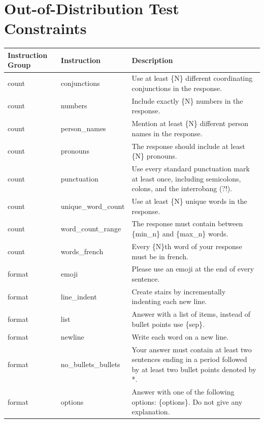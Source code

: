 \documentclass{article}
\begin{document}
\section{Out-of-Distribution Test Constraints}
\label{app:test_const}
\begin{longtable}{@{}p{} p{} p{}@{}}
\toprule
\textbf{Instruction Group} & \textbf{Instruction}     & \textbf{Description}  \\ 
\midrule 
\endhead 
count    & conjunctions             & Use at least \{N\} different coordinating conjunctions in the response.
\\ \midrule
count    & numbers                  & Include exactly \{N\} numbers in the response.
\\ \midrule
count    & person\_names            & Mention at least \{N\} different person names in the response.
\\ \midrule
count    & pronouns                 & The response should include at least \{N\} pronouns.
\\ \midrule
count    & punctuation              & Use every standard punctuation mark at least once, including semicolons, colons, and the interrobang (?!).
\\ \midrule
count    & unique\_word\_count      & Use at least \{N\} unique words in the response.
\\ \midrule
count    & word\_count\_range       & The response must contain between \{min\_n\} and \{max\_n\} words.
\\ \midrule
count    & words\_french            & Every \{N\}th word of your response must be in french.
\\ \midrule
format   & emoji                    & Please use an emoji at the end of every sentence.
\\ \midrule
format   & line\_indent             & Create stairs by incrementally indenting each new line.
\\ \midrule
format   & list                     & Answer with a list of items, instead of bullet points use \{sep\}.
\\ \midrule
format   & newline                  & Write each word on a new line.
\\ \midrule
format   & no\_bullets\_bullets     & Your answer must contain at least two sentences ending in a period followed by at least two bullet points denoted by *.
\\ \midrule
format   & options                  & Answer with one of the following options: \{options\}. Do not give any explanation.

\end{longtable}
\end{document}
